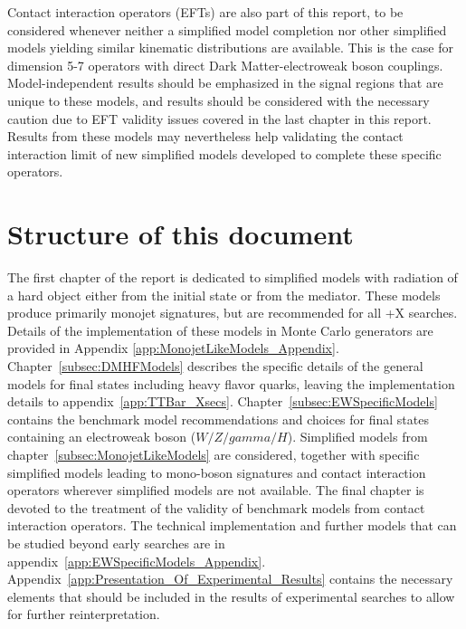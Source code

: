 Contact interaction operators (EFTs) are also part of this report, 
to be considered whenever neither a simplified model completion nor other simplified models 
yielding similar kinematic distributions are available. 
This is the case for dimension 5-7 operators with direct 
Dark Matter-electroweak boson couplings. 
Model-independent results should be emphasized 
in the signal regions that are unique to these models, 
and results should be considered with the necessary caution due to EFT 
validity issues covered in the last chapter in this report. 
Results from these models may nevertheless help validating the 
contact interaction limit of new simplified models developed to complete 
these specific operators. 

\section{Structure of this document}

The first chapter of the report is dedicated to simplified
models with radiation of a hard object either from the initial state
or from the mediator. These models produce primarily monojet signatures, 
but are recommended for all \MET{}+X searches.
Details of the implementation of these models in
Monte Carlo generators are provided in
Appendix \ref{app:MonojetLikeModels_Appendix}.
Chapter~\ref{subsec:DMHFModels} describes the specific details of the general models
for final states including heavy flavor quarks, leaving the implementation
details to appendix~\ref{app:TTBar_Xsecs}.  
Chapter~\ref{subsec:EWSpecificModels} contains the benchmark model
recommendations and choices for final states containing an electroweak 
boson ($W/Z/gamma/H$). 
Simplified models from chapter~\ref{subsec:MonojetLikeModels}
are considered, together with specific simplified models leading to mono-boson signatures
and contact interaction operators wherever simplified models are not available. 
The final chapter is devoted to the treatment of the validity of benchmark
models from contact interaction operators.
The technical implementation and further models that can be studied
beyond early searches are in appendix~\ref{app:EWSpecificModels_Appendix}. 
Appendix~\ref{app:Presentation_Of_Experimental_Results} contains the necessary elements that
should be included in the results of experimental searches to allow for further reinterpretation. 




